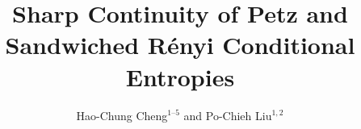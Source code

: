 \documentclass[11pt,reqno]{amsart}
\theoremstyle{definition}
\newcommand{\A}{\mathsf{A}}
\newcommand{\B}{\mathsf{B}}
\begin{document}
\let\origmaketitle\maketitle
\def\maketitle{
	\begingroup
	\def\uppercasenonmath##1{} %
	\let\MakeUppercase\relax %
	\origmaketitle
	\endgroup
}

\title[]{\bfseries \Large{ 
		Sharp Continuity of Petz and Sandwiched R\'enyi Conditional Entropies
}}

\author{ \normalsize 
	{Hao-Chung Cheng}$^{1\text{--}5}$
    and
	{Po-Chieh Liu}$^{1,2}$
}
\address{\small  	
	$^1$Department of Electrical Engineering and Graduate Institute of Communication Engineering,\\ National Taiwan University, Taipei 106, Taiwan (R.O.C.)\\
	$^2$Department of Mathematics, National Taiwan University\\
	$^3$Center for Quantum Science and Engineering, National Taiwan University\\
	$^4$Hon Hai (Foxconn) Quantum Computing Center, New Taipei City 236, Taiwan (R.O.C.)\\
	$^5$Physics/Mathematics Divisions, National Center for Theoretical Sciences, Taipei 10617, Taiwan (R.O.C.)
}


\date{}

\end{document}
